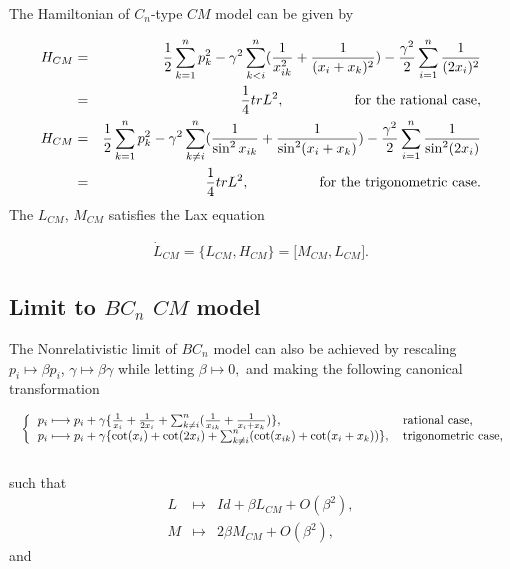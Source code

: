 \documentclass[a4paper,12pt]{article}
\begin{document}
The Hamiltonian of $C_{n}$-type $CM$ model can be given by

\begin{eqnarray}
H_{CM} &=&\frac{1}{2}\sum_{k=1}^{n}p_{k}^{2}-\gamma ^{2}\sum_{k<i}^{n}(\frac{%
1}{x_{ik}^{2}}+\frac{1}{(x_{i}+x_{k})^{2}})-\frac{\gamma ^{2}}{2}%
\sum_{i=1}^{n}\frac{1}{(2x_{i})^{2}}  \nonumber \\
&=&\frac{1}{4}trL^{2},\ \ \ \ \ \ \ \ \ \ \ \ \ \ \
\mbox{for the rational
case}, \\
H_{CM} &=&\frac{1}{2}\sum_{k=1}^{n}p_{k}^{2}-\gamma ^{2}\sum_{k\neq i}^{n}(%
\frac{1}{\sin ^{2}x_{ik}}+\frac{1}{\sin ^{2}(x_{i}+x_{k})})-\frac{\gamma ^{2}%
}{2}\sum_{i=1}^{n}\frac{1}{\sin ^{2}(2x_{i})}  \nonumber \\
&=&\frac{1}{4}trL^{2},\ \ \ \ \ \ \ \ \ \ \ \ \ \ \
\mbox{for the trigonometric
case}.
\end{eqnarray}
The $L_{CM}$, $M_{CM}$ satisfies the Lax equation

\begin{eqnarray}
\dot{L}_{CM}=\{L_{CM},H_{CM}\}=\lbrack M_{CM},L_{CM}\rbrack .
\end{eqnarray}

\subsection{Limit to $BC_{n}$ $CM$ model}

The Nonrelativistic limit of $BC_{n}$ model can also be achieved by
rescaling \ $p_{i}\longmapsto \beta p_{i}$, $\gamma \longmapsto \beta \gamma
$ while letting $\beta \longmapsto 0,$ and making the following canonical
transformation

\begin{eqnarray}
&&\left\{
\begin{tabular}{ll}
$p_{i}\longmapsto p_{i}+\gamma \{\frac{1}{x_{i}}+\frac{1}{2x_{i}}%
+\sum_{k\neq i}^{n}(\frac{1}{x_{ik}}+\frac{1}{x_{i}+x_{k}})\},\ $ & rational
case, \\
$p_{i}\longmapsto p_{i}+\gamma \{\cot (x_{i})+\cot (2x_{i})+\sum_{k\neq
i}^{n}(\cot (x_{ik})+\cot (x_{i}+x_{k}))\},$ & trigonometric case,
\end{tabular}
\right.	 \nonumber \\
&&
\end{eqnarray}
such that
\begin{eqnarray}
L &\longmapsto &Id+\beta L_{CM}+O(\beta ^{2}), \\
M &\longmapsto &2\beta M_{CM}+O(\beta ^{2}),
\end{eqnarray}
and
\end{document}
